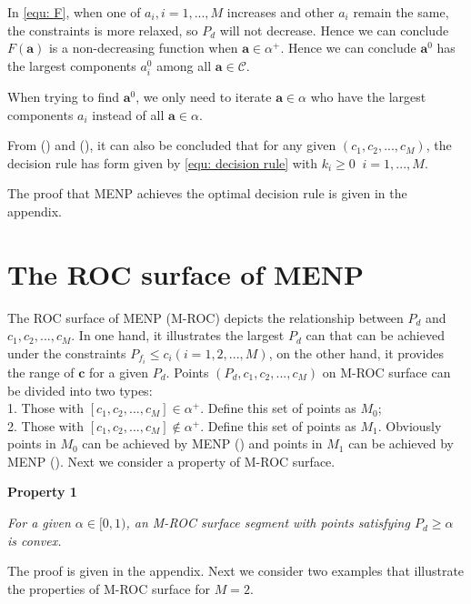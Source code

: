 \documentclass[12pt,journal,a4paper,twoside,onecolumn,draft]{IEEEtran}
\newcommand{\rmnum}[1]{\romannumeral #1}
\begin{document}
\begin{spacing}{2.5}
In \eqref{equ: F}, when one of $a_i, i = 1, ..., M$ increases and other $a_i$ remain the same, the constraints is more relaxed, so $P_d$ will not decrease. Hence we can conclude $F(\mathbf{a})$ is a non-decreasing function when $\mathbf{a} \in \alpha^+$. Hence we can conclude $\mathbf{a}^0$ has the largest components $a_i^0$ among all $\mathbf{a} \in \mathcal{C}$. 

When trying to find $\mathbf{a}^0$, we only need to iterate $\mathbf{a} \in \alpha$ who have the largest components $a_i$ instead of all $\mathbf{a} \in \alpha$.

From (\rmnum{1}) and (\rmnum{2}), it can also be concluded that for any given $(c_1, c_2, ..., c_M)$, the decision rule has form given by \eqref{equ: decision rule} with $k_i \geq 0\;\;i=1, ..., M$.

The proof that MENP achieves the optimal decision rule is given in the appendix.

\section{The ROC surface of MENP}

The ROC surface of MENP (M-ROC) depicts the relationship between $P_d$ and $c_1, c_2, ..., c_M$. In one hand, it  illustrates the largest $P_d$ can that can be achieved under the constraints $P_{f_i} \leq c_i (i = 1, 2, ..., M)$, on the other hand, it provides the range of $\mathbf{c}$ for a given $P_d$.
Points $(P_d, c_1, c_2, ..., c_M)$ on M-ROC  surface can be divided into two types: 
\\1. Those with $[c_1, c_2, ..., c_M] \in \alpha^+$. Define this set of points as $M_0$; 
\\2. Those with $[c_1, c_2, ..., c_M] \notin \alpha^+$. Define this set of points as $M_1$. Obviously points in $M_0$ can be achieved by MENP (\rmnum{1}) and points in $M_1$ can  be achieved by MENP (\rmnum{2}). Next we consider a property of M-ROC surface.

\noindent\textbf{Property 1}

\noindent  \textit{
\noindent For a given $\alpha \in [0,1)$, an M-ROC surface segment with points satisfying $P_d \geq \alpha$ is  convex.
}

The proof is given in the appendix.
Next we consider two examples that illustrate the properties of M-ROC surface for $M = 2$.


\end{spacing}
\end{document}
